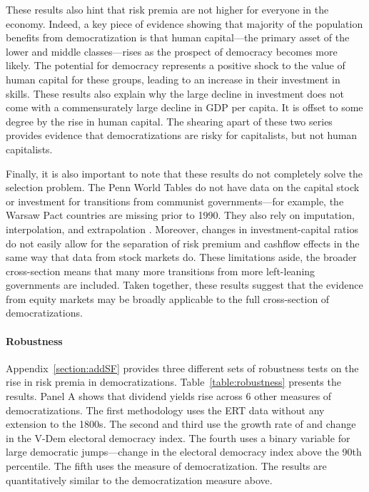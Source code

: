 These results also hint that risk premia are not higher for everyone in the economy. Indeed, a key piece of evidence showing that majority of the population benefits from democratization is that human capital---the primary asset of the lower and middle classes---rises as the prospect of democracy becomes more likely. The potential for democracy represents a positive shock to the value of human capital for these groups, leading to an increase in their investment in skills. These results also explain why the large decline in investment does not come with a commensurately large decline in GDP per capita. It is offset to some degree by the rise in human capital. The shearing apart of these two series provides evidence that democratizations are risky for capitalists, but not human capitalists.

Finally, it is also important to note that these results do not completely solve the selection problem. The Penn World Tables do not have data on the capital stock or investment for transitions from communist governments---for example, the Warsaw Pact countries are missing prior to 1990. They also rely on imputation, interpolation, and extrapolation \citep{Feenstra2015}. Moreover, changes in investment-capital ratios do not easily allow for the separation of risk premium and cashflow effects in the same way that data from stock markets do. These limitations aside, the broader cross-section means that many more transitions from more left-leaning governments are included. Taken together, these results suggest that the evidence from equity markets may be broadly applicable to the full cross-section of democratizations.
\label{par:agg_invest_end}



\paragraph{Robustness}

Appendix~\ref{section:addSF} provides three different sets of robustness tests on the rise in risk premia in democratizations. Table~\ref{table:robustness} presents the results.  Panel A shows that dividend yields rise across 6 other measures of democratizations. The first methodology uses the ERT data without any extension to the 1800s. The second and third use the growth rate of and change in the V-Dem electoral democracy index. The fourth uses a binary variable for large democratic jumps---change in the electoral democracy index above the 90th percentile. The fifth uses the \cite{Lindberg2018} measure of democratization. The results are quantitatively similar to the democratization measure above.

